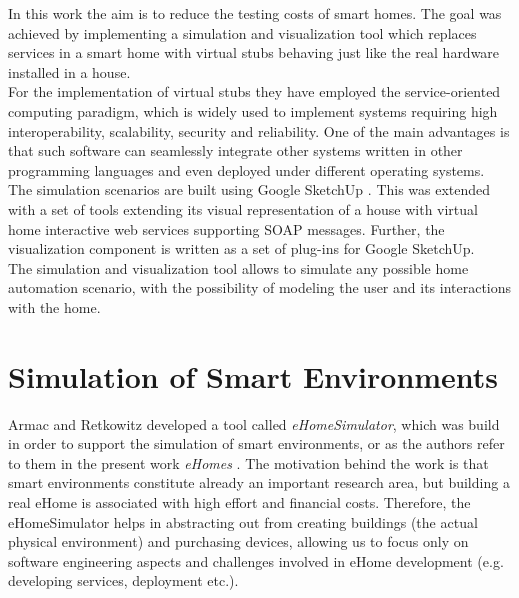In this work \cite{lazovik2009services} the aim is to reduce the testing costs of smart homes. The goal was achieved by implementing a simulation and visualization tool which replaces services in a smart home with virtual stubs behaving just like the real hardware installed in a house.\\

For the implementation of virtual stubs they have employed the service-oriented computing paradigm, which is widely used to implement systems requiring high interoperability, scalability, security and reliability. One of the main advantages is that such software can seamlessly integrate other systems written in other programming languages and even deployed under different operating systems.\\

The simulation scenarios are built using Google SketchUp \cite{sketchup:online}. This was extended with a set of tools extending its visual representation of a house with virtual home interactive web services supporting SOAP messages. Further, the visualization component is written as a set of plug-ins for Google SketchUp.\\

The simulation and visualization tool allows to simulate any possible home automation scenario, with the possibility of modeling the user and its interactions with the home.

\section{Simulation of Smart Environments}\label{sec:sim_of_smart_envs}

Armac and Retkowitz developed a tool called \emph{eHomeSimulator}, which was build in order to support the simulation of smart environments, or as the authors refer to them in the present work \emph{eHomes} \cite{armac2007simulation}. The motivation behind the work is that smart environments constitute already an important research area, but building a real eHome is associated with high effort and financial costs. Therefore, the eHomeSimulator helps in abstracting out from creating buildings (the actual physical environment) and purchasing devices, allowing us to focus only on software engineering aspects and challenges involved in eHome development (e.g. developing services, deployment etc.).\\

